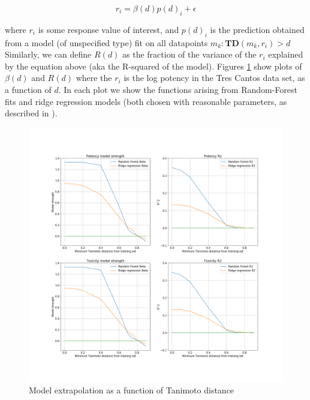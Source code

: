 \documentclass{article}
\begin{document}
\begin{equation}
    r_{i} = \beta(d) p(d)_{i} + \epsilon
\end{equation}

where $r_{i}$ is some response value of interest, and $p(d)_{i}$ is the prediction obtained from a model (of unspecified type) fit on all datapoints $m_{k} : \mathbf{TD}(m_{k}, r_{i}) > d$
\newline
\newline
Similarly, we can define $R(d)$ as the fraction of the variance  of the $r_{i}$ explained by the equation above  (aka the R-squared of the model).
\newline
\newline
Figures \ref{fig:model_extrap} show plots of $\beta(d)$ and $R(d)$ where the $r_{i}$ is the log potency in the Tres Cantos data set, as a function of $d$.  In each plot we show the functions arising from Random-Forest fits and ridge regression models (both chosen with reasonable parameters, as described in \citep{et1:}).

\begin{figure}[h!]
\centering
\includegraphics[width=\textwidth, keepaspectratio]{fig4_str_r2.png}
\caption{Model extrapolation as a function of Tanimoto distance}
\label{fig:model_extrap}
\end{figure}
\end{document}
